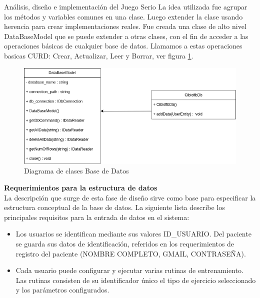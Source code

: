 \begin{thesischapter}{2} {Análisis, diseño e implementación del Juego Serio}
    La idea utilizada fue agrupar los métodos y variables comunes en una clase. Luego extender la clase usando herencia para 
    crear implementaciones reales. Fue creada una clase de alto nivel DataBaseModel que se puede extender a otras clases, con el 
    fin de acceder a las operaciones básicas de cualquier base de datos. Llamamos a estas operaciones basicas CURD: Crear, 
    Actualizar, Leer y Borrar, ver figura \ref{fig: diagram-db}.
    \begin{figure}[ht]
        \centering
        \includegraphics[scale=0.4]{images/diagram-db.png}
        \caption{Diagrama de clases Base de Datos}
        \label{fig: diagram-db}
    \end{figure}

    \vspace{10pt}
    \textbf{Requerimientos para la estructura de datos}\\
    La descripción que surge de esta fase de diseño sirve como base para especificar la estructura conceptual de la base de datos. 
    La siguiente lista describe los principales requisitos para la entrada de datos en el sistema:
    \begin{itemize}
        \item Los usuarios se identifican mediante sus valores ID\_USUARIO. Del paciente se guarda sus datos de identificación, 
        referidos en los requerimientos de registro del paciente (NOMBRE COMPLETO, GMAIL, CONTRASEÑA).
        \item Cada usuario puede configurar y ejecutar varias rutinas de entrenamiento. Las rutinas consisten de su identificador 
        único el tipo de ejercicio seleccionado y los parámetros configurados.    
    \end{itemize}
    

\end{thesischapter}
